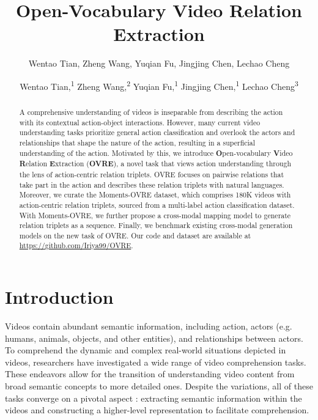 \documentclass[letterpaper]{article}
\title{Open-Vocabulary Video Relation Extraction}
\author{
Wentao Tian, Zheng Wang, Yuqian Fu, Jingjing Chen, Lechao Cheng
}
\author {
Wentao Tian,\textsuperscript{\rm 1}
Zheng Wang,\textsuperscript{\rm 2} \equalcontrib
Yuqian Fu,\textsuperscript{\rm 1}
Jingjing Chen,\textsuperscript{\rm 1}\equalcontrib
Lechao Cheng\textsuperscript{\rm 3}
}
\begin{document}
\maketitle
\begin{abstract}
A comprehensive understanding of videos is inseparable from describing the action with its contextual action-object interactions. However, many current video understanding tasks prioritize general action classification and overlook the actors and relationships that shape the nature of the action, resulting in a superficial understanding of the action.
Motivated by this, we introduce \textbf{O}pen-vocabulary  \textbf{V}ideo \textbf{R}elation \textbf{E}xtraction (\textbf{OVRE}), a novel task that views action understanding through the lens of action-centric relation triplets. OVRE focuses on pairwise relations that take part in the action and describes these relation triplets with natural languages. Moreover, we curate the Moments-OVRE dataset, which comprises 180K videos with action-centric relation triplets, sourced from a multi-label action classification dataset. With Moments-OVRE, we further propose a cross-modal mapping model to generate relation triplets as a sequence. Finally, we benchmark existing cross-modal generation models on the new task of OVRE. Our code and dataset are available at
\url{https://github.com/Iriya99/OVRE}.

\end{abstract}

\section{Introduction}
Videos contain abundant semantic information, including action, actors (e.g. humans, animals, objects, and other entities), and relationships between actors.
To comprehend the dynamic and complex real-world situations depicted in videos, researchers have investigated a wide range of video comprehension tasks.
These endeavors allow for the transition of understanding video content from broad semantic concepts to more detailed ones. %
Despite the variations, all of these tasks converge on a pivotal aspect
: extracting semantic information within the videos and constructing a higher-level representation to facilitate comprehension.
\end{document}
